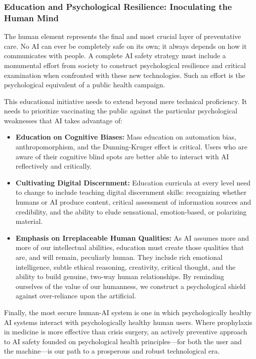 \documentclass{article}
\begin{document}
\subsubsection{Education and Psychological Resilience: Inoculating the Human Mind}
The human element represents the final and most crucial layer of preventative care. No AI can ever be completely safe on its own; it always depends on how it communicates with people. A complete AI safety strategy must include a monumental effort from society to construct psychological resilience and critical examination when confronted with these new technologies. Such an effort is the psychological equivalent of a public health campaign.

This educational initiative needs to extend beyond mere technical proficiency. It needs to prioritize vaccinating the public against the particular psychological weaknesses that AI takes advantage of:
\begin{itemize}
    \item \textbf{Education on Cognitive Biases:} Mass education on automation bias, anthropomorphism, and the Dunning-Kruger effect is critical. Users who are aware of their cognitive blind spots are better able to interact with AI reflectively and critically.
    \item \textbf{Cultivating Digital Discernment:} Education curricula at every level need to change to include teaching digital discernment skills: recognizing whether humans or AI produce content, critical assessment of information sources and credibility, and the ability to elude sensational, emotion-based, or polarizing material.
    \item \textbf{Emphasis on Irreplaceable Human Qualities:} As AI assumes more and more of our intellectual abilities, education must create those qualities that are, and will remain, peculiarly human. They include rich emotional intelligence, subtle ethical reasoning, creativity, critical thought, and the ability to build genuine, two-way human relationships. By reminding ourselves of the value of our humanness, we construct a psychological shield against over-reliance upon the artificial.
\end{itemize}
Finally, the most secure human-AI system is one in which psychologically healthy AI systems interact with psychologically healthy human users. Where prophylaxis in medicine is more effective than crisis surgery, an actively preventive approach to AI safety founded on psychological health principles—for both the user and the machine—is our path to a prosperous and robust technological era.
\end{document}
